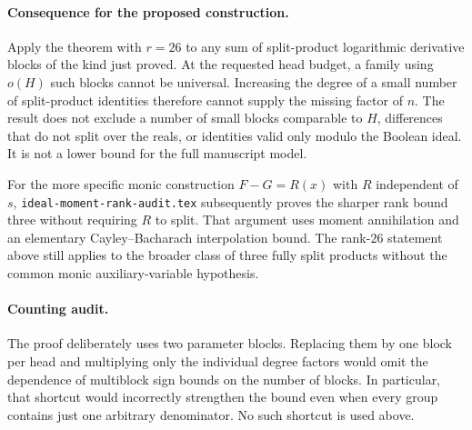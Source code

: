 \documentclass[11pt]{article}
\begin{document}
\paragraph{Consequence for the proposed construction.}
Apply the theorem with $r=26$ to any sum of split-product logarithmic
derivative blocks of the kind just proved. At the requested head
budget, a family using $o(H)$ such blocks cannot be universal.
Increasing the degree of a small number of split-product identities
therefore cannot supply the missing factor of $n$.
The result does not exclude a number of small blocks comparable to
$H$, differences that do not split over the reals, or identities valid
only modulo the Boolean ideal. It is not a lower bound for the full
manuscript model.

For the more specific monic construction $F-G=R(x)$ with $R$
independent of $s$, \texttt{ideal-moment-rank-audit.tex} subsequently
proves the sharper rank bound three without requiring $R$ to split.
That argument uses moment annihilation and an elementary
Cayley--Bacharach interpolation bound. The rank-$26$ statement above
still applies to the broader class of three fully split products
without the common monic auxiliary-variable hypothesis.

\paragraph{Counting audit.}
The proof deliberately uses two parameter blocks. Replacing them by
one block per head and multiplying only the individual degree factors
would omit the dependence of multiblock sign bounds on the number of
blocks. In particular, that shortcut would incorrectly strengthen the
bound even when every group contains just one arbitrary denominator.
No such shortcut is used above.
\end{document}
